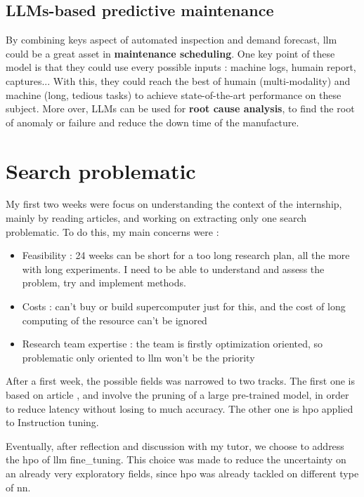 \subsection{LLMs-based predictive maintenance}
\label{sec:llm_pred_maint}
By combining keys aspect of automated inspection and demand forecast, \acrshort{llm} could be a great asset in \textbf{maintenance scheduling}. One key point of these model is that they could use every possible inputs : machine logs, humain report, captures... With this, they could reach the best of humain (multi-modality) and machine (long, tedious tasks) to achieve state-of-the-art performance on these subject. More over, LLMs can be used for \textbf{root cause analysis}, to find the root of anomaly or failure and reduce the down time of the manufacture. 

\section{Search problematic}
My first two weeks were focus on understanding the context of the internship, mainly by reading articles, and working on extracting only one search problematic. To do this, my main concerns were : 
\begin{itemize}
    \item Feasibility : 24 weeks can be short for a too long research plan, all the more with long experiments. I need to be able to understand and assess the problem, try and implement methods.
    \item Costs : can't buy or build supercomputer just for this, and the cost of long computing of the resource can't be ignored 
    \item Research team expertise : the team is firstly optimization oriented, so problematic only oriented to \acrshort{llm} won't be the priority
\end{itemize}

After a first week, the possible fields was narrowed to two tracks. The first one is based on article \cite{klein_structural_2023}, and involve the pruning of a large pre-trained model, in order to reduce latency without losing to much accuracy. The other one \cite{tribes_hyperparameter_2024} is \acrlong{hpo} applied to Instruction tuning.  

Eventually, after reflection and discussion with my tutor, we choose to address the \acrshort{hpo} of \acrshort{llm} \gls{fine_tuning}. This choice was made to reduce the uncertainty on an already very exploratory fields, since \acrshort{hpo} was already tackled on different type of \acrshort{nn}. 

